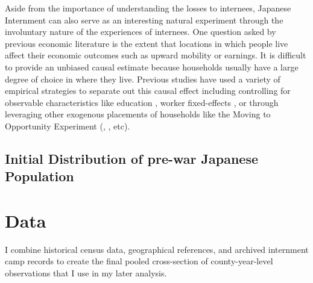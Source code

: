 \documentclass[12pt]{article}
\begin{document}
Aside from the importance of understanding the losses to internees, Japanese
Internment can also serve as an interesting natural experiment through the
involuntary nature of the experiences of internees. One question asked by
previous economic literature is the extent that locations in which people live
affect their economic outcomes such as upward mobility or earnings. It is
difficult to provide an unbiased causal estimate because households usually
have a large degree of choice in where they live. Previous studies have used a
variety of empirical strategies to separate out this causal effect including
controlling for observable characteristics like education
\cite{glaeser_cities_2001}, worker fixed-effects \citep{card_location_2021}, or
through leveraging other exogenous placements of households like the Moving to
Opportunity Experiment (\cite{ludwig_long-term_2013},
\cite{chetty_effects_2016}, etc). 

% 
%   

\subsection{Initial Distribution of pre-war Japanese
Population}\label{initial-distribution-of-pre-war-japanese-population}

\section{Data}\label{data}

I combine historical census data, geographical references, and archived internment camp records to create the final pooled cross-section of county-year-level observations that I use in my later analysis. 
\end{document}
